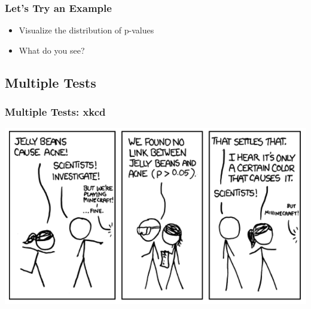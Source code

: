 \documentclass[14pt,handout]{beamer}
\begin{document}
\begin{frame}
\frametitle{Let's Try an Example}
\begin{itemize}
	\item<+-> Visualize the distribution of p-values
	\item<+-> What do you see?
\end{itemize}
\end{frame}


\subsection{Multiple Tests}

\begin{frame}
\frametitle{Multiple Tests: xkcd}
	\begin{center}
	\includegraphics[width=1.0\textwidth]{images_20171128_xkcd_pval1.png}
	\end{center}
\end{frame}
\end{document}
